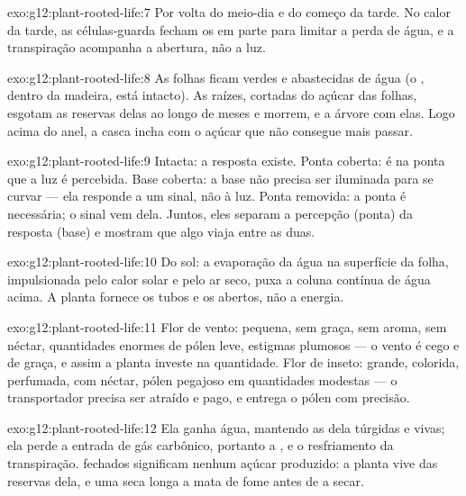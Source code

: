 \begin{solution}{exo:g12:plant-rooted-life:7}
Por volta do meio-dia e do começo da tarde. No calor da tarde, as
células-guarda fecham os  em parte para limitar a perda de
água, e a transpiração acompanha a abertura, não a luz.
\end{solution}

\begin{solution}{exo:g12:plant-rooted-life:8}
As folhas ficam verdes e abastecidas de água (o , dentro da
madeira, está intacto). As raízes, cortadas do açúcar das folhas,
esgotam as reservas delas ao longo de meses e morrem, e a árvore com
elas. Logo acima do anel, a casca incha com o açúcar que não consegue
mais passar.
\end{solution}

\begin{solution}{exo:g12:plant-rooted-life:9}
Intacta: a resposta existe. Ponta coberta: é na ponta que a luz é
percebida. Base coberta: a base não precisa ser iluminada para se
curvar --- ela responde a um sinal, não à luz. Ponta removida: a ponta
é necessária; o sinal vem dela. Juntos, eles separam a percepção
(ponta) da resposta (base) e mostram que algo viaja entre as duas.
\end{solution}

\begin{solution}{exo:g12:plant-rooted-life:10}
Do sol: a evaporação da água na superfície da folha, impulsionada pelo
calor solar e pelo ar seco, puxa a coluna contínua de água 
acima. A planta fornece os tubos e os  abertos, não a energia.
\end{solution}

\begin{solution}{exo:g12:plant-rooted-life:11}
Flor de vento: pequena, sem graça, sem aroma, sem néctar, quantidades
enormes de pólen leve, estigmas plumosos --- o vento é cego e de graça,
e assim a planta investe na quantidade. Flor de inseto: grande,
colorida, perfumada, com néctar, pólen pegajoso em quantidades modestas
--- o transportador precisa ser atraído e pago, e entrega o pólen com precisão.
\end{solution}

\begin{solution}{exo:g12:plant-rooted-life:12}
Ela ganha água, mantendo as  dela túrgidas e vivas; ela perde a
entrada de gás carbônico, portanto a , e o resfriamento da
transpiração.  fechados significam nenhum açúcar produzido: a
planta vive das reservas dela, e uma seca longa a mata de fome antes de
a secar.
\end{solution}

